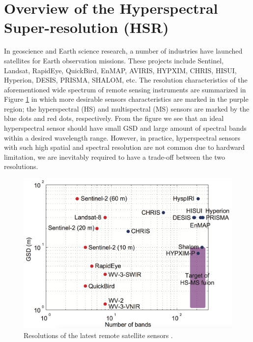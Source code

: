 \section{Overview of the Hyperspectral Super-resolution (HSR)}
\label{sec:HSR}
In geoscience and Earth science research, a number of industries have launched
satellites for Earth observation missions.
These projects include Sentinel, Landsat, RapidEye, QuickBird, EnMAP, AVIRIS,
HYPXIM, CHRIS, HISUI, Hyperion, DESIS, PRISMA, SHALOM, etc.
The resolution characteristics of the aforementioned wide spectrum of remote
sensing instruments are summarized in Figure \ref{fig:INTRO_HSMSSensors_Res}
\cite{HSMS_DATA_FUSION_A_COMPARATIVE_REVIEW}
in which more desirable sensors characteristics are marked in the purple
region; the hyperspectral (HS) and multispectral (MS) sensors are marked by
the blue dots and red dots, respectively.
From the figure we see that an ideal hyperspectral sensor should have small
GSD and large amount of spectral bands within a desired wavelength range.
However, in practice, hyperspectral sensors with such high spatial and
spectral resolution are not common due to hardward limitation, \ie we are
inevitably required to have a trade-off between the two resolutions.
\begin{figure}[t]
    \centering
    \includegraphics[width=.75\textwidth]{./fig/fig_01Intro/Introduction_HSMSSensors_Res}
    \caption{Resolutions of the latest remote satellite sensors
             \cite{HSMS_DATA_FUSION_A_COMPARATIVE_REVIEW}.}
    \label{fig:INTRO_HSMSSensors_Res}
\end{figure}

